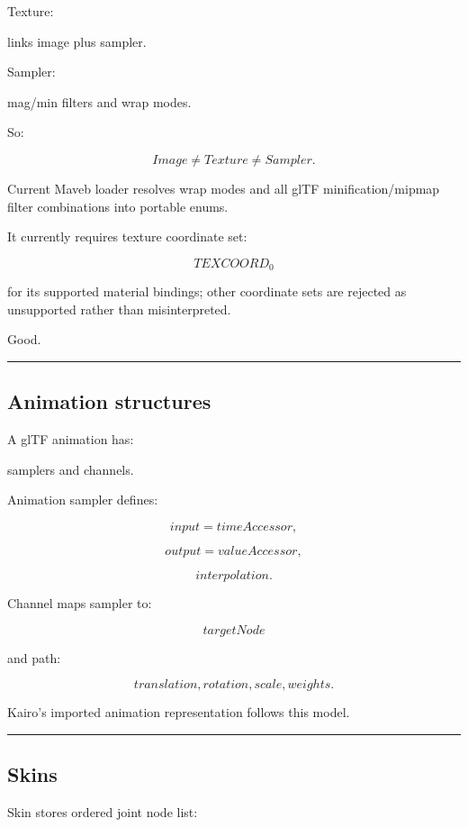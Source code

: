 Texture:

links image plus sampler.

Sampler:

mag/min filters and wrap modes.

So:

\[
\boxed{
Image
\neq
Texture
\neq
Sampler.
}
\]

Current Maveb loader resolves wrap modes and all glTF minification/mipmap filter combinations into portable enums.

It currently requires texture coordinate set:

\[
TEXCOORD_0
\]

for its supported material bindings; other coordinate sets are rejected as unsupported rather than misinterpreted.

Good.

\begin{center}\rule{0.5\linewidth}{0.5pt}\end{center}

\subsection{Animation structures}\label{04-visual-computing-ii-ch041-animation-structures}

A glTF animation has:

samplers and channels.

Animation sampler defines:

\[
input=timeAccessor,
\]

\[
output=valueAccessor,
\]

\[
interpolation.
\]

Channel maps sampler to:

\[
targetNode
\]

and path:

\[
translation,
rotation,
scale,
weights.
\]

Kairo's imported animation representation follows this model.

\begin{center}\rule{0.5\linewidth}{0.5pt}\end{center}

\subsection{Skins}\label{04-visual-computing-ii-ch041-skins}

Skin stores ordered joint node list:


